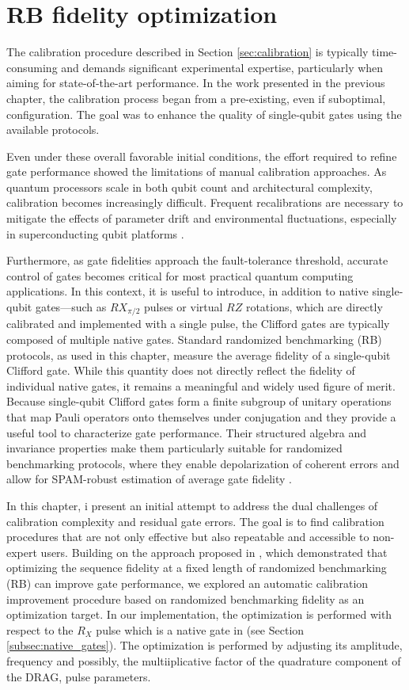\chapter{RB fidelity optimization}
The calibration procedure described in Section \ref{sec:calibration} is typically time-consuming and demands significant experimental expertise, particularly when aiming for state-of-the-art performance. 
In the work presented in the previous chapter, the calibration process began from a pre-existing, even if suboptimal, configuration. 
The goal was to enhance the quality of single-qubit gates using the available \Qibocal protocols.

Even under these overall favorable initial conditions, the effort required to refine gate performance showed the limitations of manual calibration approaches. 
As quantum processors scale in both qubit count and architectural complexity, calibration becomes increasingly difficult. 
Frequent recalibrations are necessary to mitigate the effects of parameter drift and environmental fluctuations, especially in superconducting qubit platforms \cite{krantz_quantum_2019}.

Furthermore, as gate fidelities approach the fault-tolerance threshold, accurate control of gates becomes critical for most practical quantum computing applications. 
In this context, it is useful to introduce, in addition to native single-qubit gates—such as $RX_{\pi/2}$ pulses or virtual $RZ$ rotations, which are directly calibrated and implemented with a single pulse, the Clifford gates are typically composed of multiple native gates. 
Standard randomized benchmarking (RB) protocols, as used in this chapter, measure the average fidelity of a single-qubit Clifford gate. 
While this quantity does not directly reflect the fidelity of individual native gates, it remains a meaningful and widely used figure of merit. 
Because single-qubit Clifford gates form a finite subgroup of unitary operations that map Pauli operators onto themselves under conjugation and they provide a useful tool to characterize gate performance. 
Their structured algebra and invariance properties make them particularly suitable for randomized benchmarking protocols, where they enable depolarization of coherent errors and allow for SPAM-robust estimation of average gate fidelity \cite{knill_randomized_2008}.

In this chapter, i present an initial attempt to address the dual challenges of calibration complexity and residual gate errors. 
The goal is to find calibration procedures that are not only effective but also repeatable and accessible to non-expert users.  
Building on the approach proposed in \cite{kelly_optimal_2014}, which demonstrated that optimizing the sequence fidelity at a fixed length of randomized benchmarking (RB) can improve gate performance, we explored an automatic calibration improvement procedure based on randomized benchmarking fidelity as an optimization target.
In our implementation, the optimization is performed with respect to the $R_X$ pulse which is a native gate in \Qibolab (see Section \ref{subsec:native_gates}).
The optimization is performed by adjusting its amplitude, frequency and possibly, the multiiplicative factor of the quadrature component of the DRAG, pulse parameters.

